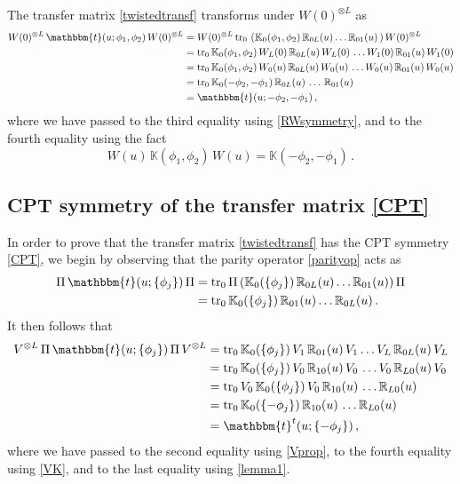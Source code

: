 \documentclass[12pt]{article}
\numberwithin{equation}{section}
\begin{document}
The transfer matrix \eqref{twistedtransf} transforms under $W(0)^{\otimes L}$ as
\begin{align}
   W(0)^{\otimes L}\,  
   \mathbbm{t}(u; \phi_1, \phi_2)\, W(0)^{\otimes L} & = W(0)^{\otimes L}\, \mathrm{tr}_{0}\, \left(  \mathbb{K}_0(\phi_1, \phi_2)\, \mathbb{R}_{0L}(u)\dots \mathbb{R}_{01}(u)\, \right) W(0)^{\otimes L} \nonumber \\
 & =  \mathrm{tr}_{0}\, \mathbb{K}_0(\phi_1, \phi_2)\, W_L(0)\, \mathbb{R}_{0L}(u)\, W_L(0)\, \dots W_1(0)\,\mathbb{R}_{01}(u)\, W_1(0) \nonumber \\
  & =  \mathrm{tr}_{0}\, \mathbb{K}_0(\phi_1, \phi_2)\, W_0(u)\, \mathbb{R}_{0L}(u)\, W_0(u)\, \dots W_0(u)\,\mathbb{R}_{01}(u)\, W_0(u) \nonumber \\
  & =  \mathrm{tr}_{0}\, \mathbb{K}_0(-\phi_2, -\phi_1)\,  \mathbb{R}_{0L}(u)\,  \dots \,\mathbb{R}_{01}(u) \nonumber \\
   & = \mathbbm{t}(u; -\phi_2, -\phi_1)\,,
   \label{Wsymproof}
\end{align}
where we have passed to the third equality using \eqref{RWsymmetry}, and to the fourth equality using the fact
\begin{equation}
    W(u)\, \mathbb{K}(\phi_1, \phi_2)\, W(u) =  \mathbb{K}(-\phi_2, -\phi_1) \,. 
\end{equation}

\subsection{CPT symmetry of the transfer matrix \eqref{CPT}}

In order to prove that the transfer matrix \eqref{twistedtransf} has
the CPT symmetry \eqref{CPT}, we begin by observing that the parity operator \eqref{parityop} acts as
\begin{align}
    \Pi\, \mathbbm{t}(u; \{\phi_j \})\, \Pi &= \mathrm{tr}_{0}\, \Pi \left(\mathbb{K}_0(\{\phi_j \})\, \mathbb{R}_{0L}(u)\dots \mathbb{R}_{01}(u) \right) \Pi \nonumber\\
    & = \mathrm{tr}_{0}\, \mathbb{K}_0(\{\phi_j \})\, \mathbb{R}_{01}(u)\dots \mathbb{R}_{0L}(u) \,.
\end{align}
It then follows that
\begin{align}
    V^{\otimes L}\, \Pi\, \mathbbm{t}(u; \{\phi_j \})\, \Pi\, V^{\otimes L} &= \mathrm{tr}_{0}\, \mathbb{K}_0(\{\phi_j \})\, V_1\, \mathbb{R}_{01}(u)\, V_1 \dots V_L\, \mathbb{R}_{0L}(u) \, V_L \nonumber \\
    &= \mathrm{tr}_{0}\,  \mathbb{K}_0(\{\phi_j \})\, V_0\, \mathbb{R}_{10}(u)\, V_0\, \dots  V_0\, \mathbb{R}_{L0}(u)\, V_0 \nonumber \\
    &= \mathrm{tr}_{0}\, V_0\, \mathbb{K}_0(\{\phi_j \})\, V_0\, \mathbb{R}_{10}(u)\,  \dots  \mathbb{R}_{L0}(u) \nonumber \\
    &= \mathrm{tr}_{0}\, \mathbb{K}_0(\{-\phi_j \})\, \mathbb{R}_{10}(u)\,  \dots  \mathbb{R}_{L0}(u) \nonumber \\
    &= \mathbbm{t}^t(u; \{-\phi_j \}) \,,
    \label{CPTproof}
\end{align}
where we have passed to the second equality using \eqref{Vprop}, to the fourth equality using \eqref{VK}, and to the last equality using \eqref{lemma1}. 
\end{document}
